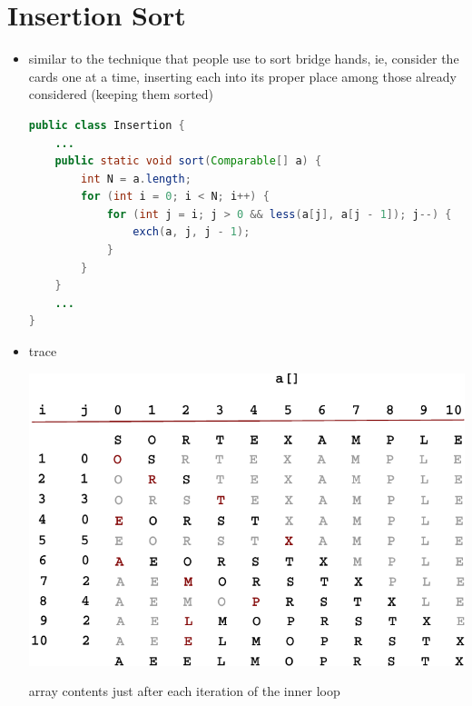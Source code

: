 \documentclass[8pt,a4paper,compress]{beamer}
\begin{document}
\section{Insertion Sort}
\begin{frame}[fragile]
\begin{itemize}
\item similar to the technique that people use to sort bridge hands, ie, consider the cards one at a time, inserting each into its proper place among those already considered (keeping them sorted)
\begin{lstlisting}[language=Java]
public class Insertion {
    ...
    public static void sort(Comparable[] a) {
        int N = a.length;
        for (int i = 0; i < N; i++) {
            for (int j = i; j > 0 && less(a[j], a[j - 1]); j--) {
                exch(a, j, j - 1);
            }
        }
    }
    ...
}
\end{lstlisting}
\end{itemize}
\end{frame}

\begin{frame}[fragile]
\begin{itemize}
\item trace

\begin{center}
\includegraphics[scale=0.65]{./figures/insertion_trace.pdf}

\smallskip

array contents just after each iteration of the inner loop
\end{center}
\end{itemize}
\end{frame}
\end{document}
